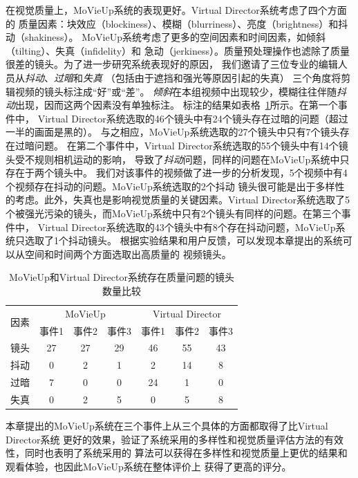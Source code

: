 \documentclass[doctor]{ustcthesis}
\begin{document}
在视觉质量上，MoVieUp系统的表现更好。Virtual Director系统考虑了四个方面的
质量因素：块效应（blockiness）、模糊（blurriness）、亮度（brightness）和抖动（shakiness）。
MoVieUp系统考虑了更多的空间因素和时间因素，如倾斜（tilting）、失真（infidelity）和
急动（jerkiness）。质量预处理操作也滤除了质量很差的镜头。为了进一步研究系统表现好的原因，
我们邀请了三位专业的编辑人员从\emph{抖动}、\emph{过暗}和\emph{失真}
（包括由于遮挡和强光等原因引起的失真） 三个角度将剪辑视频的镜头标注成``好''或``差''。
\emph{倾斜}在本组视频中出现较少，模糊往往伴随\emph{抖动}出现，因而这两个因素没有单独标注。
标注的结果如表格~\ref{tab:mashup-vd-obj-comp}所示。在第一个事件中，
Virtual Director系统选取的46个镜头中有24个镜头存在过暗的问题（超过一半的画面是黑的）。
与之相应，MoVieUp系统选取的27个镜头中只有7个镜头存在过暗问题。
在第二个事件中，Virtual Director系统选取的55个镜头中有14个镜头受不规则相机运动的影响，
导致了\emph{抖动}问题，同样的问题在MoVieUp系统中只存在于两个镜头中。
我们对该事件的视频做了进一步的分析发现，5个视频中有4个视频存在抖动的问题。MoVieUp系统选取的2个抖动
镜头很可能是出于多样性的考虑。此外，失真也是影响视觉质量的关键因素。Virtual
Director系统选取了5个被强光污染的镜头，而MoVieUp系统中只有2个镜头有同样的问题。在第三个事件中，
Virtual Director系统选取的43个镜头中有8个存在抖动问题，MoVieUp系统只选取了1个抖动镜头。
根据实验结果和用户反馈，可以发现本章提出的系统可以从空间和时间两个方面选取出高质量的
视频镜头。
\begin{table}[t]
    \centering
    \caption{MoVieUp和Virtual Director系统存在质量问题的镜头数量比较}
    \label{tab:mashup-vd-obj-comp}
    \begin{tabular}{|c|c|c|c|c|c|c|}
        \hline
        \multirow{2}{*}{因素} & \multicolumn{3}{c|}{MoVieUp} & \multicolumn{3}{c|}{Virtual Director}  \\ \cline{2-7}
        & 事件1 & 事件2 & 事件3 & 事件1 & 事件2 & 事件3 \\ \hline
        镜头	& 27 & 27 & 29 & 46 & 55& 43 \\ \hline
        抖动	& 0 & 2 & 1 & 2 & 14& 8 \\ \hline
        过暗	& 7 & 0 & 0 & 24 & 1& 0 \\ \hline
        失真	& 0 & 2 & 5 & 0 & 5& 8 \\ \hline
    \end{tabular}
\end{table}

本章提出的MoVieUp系统在三个事件上从三个具体的方面都取得了比Virtual Director系统
更好的效果，验证了系统采用的多样性和视觉质量评估方法的有效性，同时也表明了系统采用的
算法可以获得在多样性和视觉质量上更优的结果和观看体验，也因此MoVieUp系统在整体评价上
获得了更高的评分。
\end{document}
